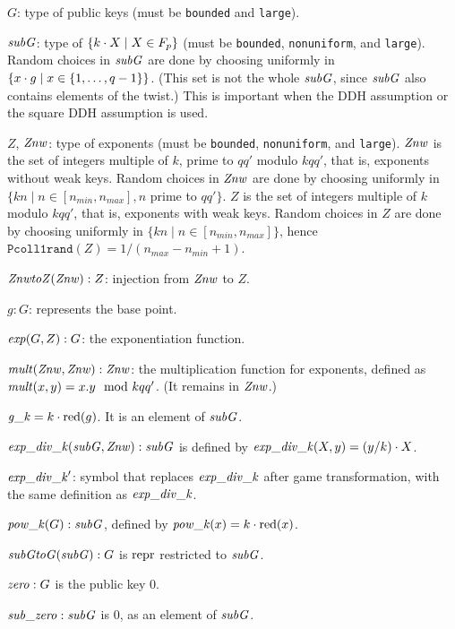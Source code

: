 \documentclass{article}
\begin{document}
\begin{itemize}
\begin{itemize}
\begin{itemize}
       $G$: type of public keys (must be \texttt{bounded} and \texttt{large}).

       $\mathit{subG}$: type of $\{ {k}\cdot{X} \mid X \in F_p \}$  (must be \texttt{bounded}, \texttt{nonuniform}, and \texttt{large}). 
     Random choices in $\mathit{subG}$ are done by choosing uniformly in 
     $\{ {x}\cdot{g} \mid x \in \{ 1, \dots, q-1 \} \}$. (This set is not the whole $\mathit{subG}$,
     since $\mathit{subG}$ also contains elements of the twist.)
     This is important when the DDH assumption or the square DDH assumption
     is used.
       

       $Z$, $\mathit{Znw}$: type of exponents (must be \texttt{bounded}, \texttt{nonuniform}, and \texttt{large}). 
   $\mathit{Znw}$ is the set of integers multiple of $k$, prime to $qq'$ modulo $kqq'$, that is, exponents without weak keys.
     Random choices in $\mathit{Znw}$ are done by choosing uniformly in 
     $\{ kn \mid n \in [n_{min},n_{max}], n$ prime to $qq' \}$.
       $Z$ is the set of integers multiple of $k$ modulo $kqq'$, that is, exponents with weak keys. Random choices in $Z$ are done by choosing uniformly in 
   $\{ kn \mid n \in [n_{min},n_{max}] \}$, hence $\texttt{Pcoll1rand}(Z) = 1/(n_{max}-n_{min}+1)$. 
       
       $\mathit{ZnwtoZ}(\mathit{Znw}):Z$: injection from $\mathit{Znw}$ to $Z$.

       $g: G$: represents the base point.

       $\mathit{exp}(G, Z): G$: the exponentiation function.  
       
       $\mathit{mult}(\mathit{Znw}, \mathit{Znw}): \mathit{Znw}$: the multiplication function for exponents, defined as
       $\mathit{mult}(x,y) = x.y \mod kqq'$. (It remains in $\mathit{Znw}$.)

       $\mathit{g\_k} = {k}\cdot{\mathrm{red}(g)}$. It is an element of $\mathit{subG}$.

       $\mathit{exp\_div\_k}(\mathit{subG},\mathit{Znw}): \mathit{subG}$ is defined by $\mathit{exp\_div\_k}(X,y) = {(y/k)}\cdot{X}$.

       $\mathit{exp\_div\_k}'$: symbol that replaces $\mathit{exp\_div\_k}$ after game transformation,
       with the same definition as $\mathit{exp\_div\_k}$.

       $\mathit{pow\_k}(G):\mathit{subG}$, defined by $\mathit{pow\_k}(x) = {k}\cdot{\mathrm{red}(x)}$.

       $\mathit{subGtoG}(\mathit{subG}):G$ is $\mathrm{repr}$ restricted to $\mathit{subG}$.

       $\mathit{zero}: G$ is the public key 0.
       
       $\mathit{sub\_zero}: \mathit{subG}$ is 0, as an element of $\mathit{subG}$.


\end{itemize}
\end{itemize}
\end{itemize}
\end{document}
